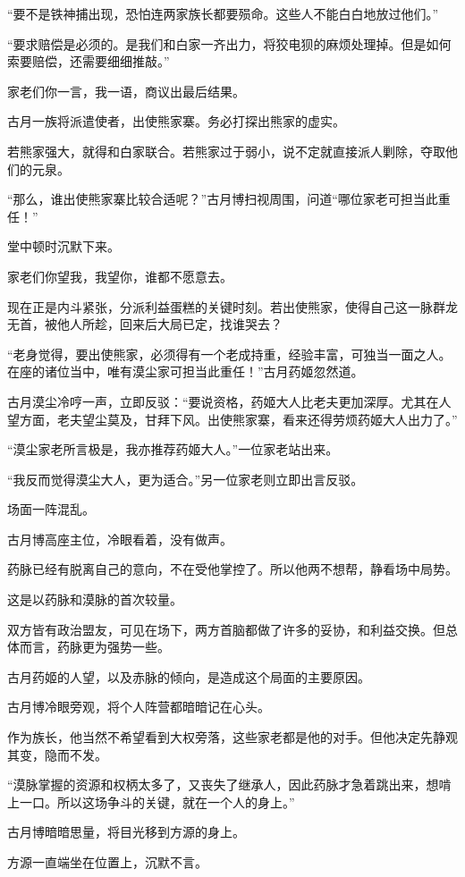 \begin{this_body}
“要不是铁神捕出现，恐怕连两家族长都要殒命。这些人不能白白地放过他们。”

“要求赔偿是必须的。是我们和白家一齐出力，将狡电狈的麻烦处理掉。但是如何索要赔偿，还需要细细推敲。”

家老们你一言，我一语，商议出最后结果。

古月一族将派遣使者，出使熊家寨。务必打探出熊家的虚实。

若熊家强大，就得和白家联合。若熊家过于弱小，说不定就直接派人剿除，夺取他们的元泉。

“那么，谁出使熊家寨比较合适呢？”古月博扫视周围，问道“哪位家老可担当此重任！”

堂中顿时沉默下来。

家老们你望我，我望你，谁都不愿意去。

现在正是内斗紧张，分派利益蛋糕的关键时刻。若出使熊家，使得自己这一脉群龙无首，被他人所趁，回来后大局已定，找谁哭去？

“老身觉得，要出使熊家，必须得有一个老成持重，经验丰富，可独当一面之人。在座的诸位当中，唯有漠尘家可担当此重任！”古月药姬忽然道。

古月漠尘冷哼一声，立即反驳：“要说资格，药姬大人比老夫更加深厚。尤其在人望方面，老夫望尘莫及，甘拜下风。出使熊家寨，看来还得劳烦药姬大人出力了。”

“漠尘家老所言极是，我亦推荐药姬大人。”一位家老站出来。

“我反而觉得漠尘大人，更为适合。”另一位家老则立即出言反驳。

场面一阵混乱。

古月博高座主位，冷眼看着，没有做声。

药脉已经有脱离自己的意向，不在受他掌控了。所以他两不想帮，静看场中局势。

这是以药脉和漠脉的首次较量。

双方皆有政治盟友，可见在场下，两方首脑都做了许多的妥协，和利益交换。但总体而言，药脉更为强势一些。

古月药姬的人望，以及赤脉的倾向，是造成这个局面的主要原因。

古月博冷眼旁观，将个人阵营都暗暗记在心头。

作为族长，他当然不希望看到大权旁落，这些家老都是他的对手。但他决定先静观其变，隐而不发。

“漠脉掌握的资源和权柄太多了，又丧失了继承人，因此药脉才急着跳出来，想啃上一口。所以这场争斗的关键，就在一个人的身上。”

古月博暗暗思量，将目光移到方源的身上。

方源一直端坐在位置上，沉默不言。


\end{this_body}
